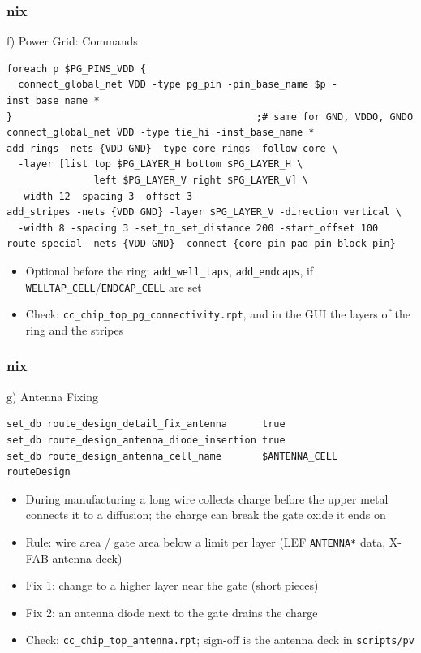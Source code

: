 \documentclass{beamer}
\newcommand{\astitle}{nix}
\newcommand{\assubtitle}{nix}
\newcommand{\cmd}[1]{\texttt{#1}}
\begin{document}
\renewcommand{\assubtitle}{f) Power Grid: Commands}
\begin{frame}[fragile]
\frametitle{\astitle}
\begin{block}{\assubtitle}
\begin{lstlisting}[style=sh]
foreach p $PG_PINS_VDD {
  connect_global_net VDD -type pg_pin -pin_base_name $p -inst_base_name *
}                                          ;# same for GND, VDDO, GNDO
connect_global_net VDD -type tie_hi -inst_base_name *
add_rings -nets {VDD GND} -type core_rings -follow core \
  -layer [list top $PG_LAYER_H bottom $PG_LAYER_H \
               left $PG_LAYER_V right $PG_LAYER_V] \
  -width 12 -spacing 3 -offset 3
add_stripes -nets {VDD GND} -layer $PG_LAYER_V -direction vertical \
  -width 8 -spacing 3 -set_to_set_distance 200 -start_offset 100
route_special -nets {VDD GND} -connect {core_pin pad_pin block_pin}
\end{lstlisting}
  \scriptsize
  \begin{itemize}
    \item Optional before the ring: \cmd{add\_well\_taps},
      \cmd{add\_endcaps}, if \cmd{WELLTAP\_CELL}/\cmd{ENDCAP\_CELL} are set
    \item Check: \cmd{cc\_chip\_top\_pg\_connectivity.rpt}, and in the GUI
      the layers of the ring and the stripes
  \end{itemize}
\end{block}
\end{frame}

\renewcommand{\assubtitle}{g) Antenna Fixing}
\begin{frame}[fragile]
\frametitle{\astitle}
\begin{block}{\assubtitle}
\begin{lstlisting}[style=sh]
set_db route_design_detail_fix_antenna      true
set_db route_design_antenna_diode_insertion true
set_db route_design_antenna_cell_name       $ANTENNA_CELL
routeDesign
\end{lstlisting}
  \begin{itemize}
    \item During manufacturing a long wire collects charge before the
      upper metal connects it to a diffusion; the charge can break the
      gate oxide it ends on
    \item Rule: wire area / gate area below a limit per layer (LEF
      \cmd{ANTENNA*} data, X-FAB antenna deck)
    \item Fix 1: change to a higher layer near the gate (short pieces)
    \item Fix 2: an antenna diode next to the gate drains the charge
    \item Check: \cmd{cc\_chip\_top\_antenna.rpt}; sign-off is the antenna
      deck in \cmd{scripts/pv}
  \end{itemize}
\end{block}
\end{frame}
\end{document}
